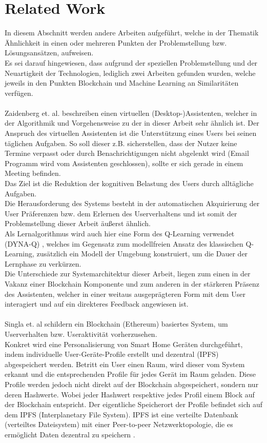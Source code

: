 \section{Related Work}
In diesem Abschnitt werden andere Arbeiten aufgeführt, welche in der Thematik Ähnlichkeit in einen oder mehreren Punkten der Problemstellung bzw. Lösungsansätzen, aufweisen. \\
Es sei darauf hingewiesen, dass aufgrund der speziellen Problemstellung und der Neuartigkeit der Technologien, lediglich zwei Arbeiten gefunden wurden, welche jeweils in den Punkten Blockchain und Machine Learning an Similaritäten verfügen. \\\\
Zaidenberg et. al. \cite{zaidenberg:hal-00788028} beschreiben einen virtuellen (Desktop-)Assistenten, welcher in der Al­go­rith­mik und Vorgehensweise zu der in dieser Arbeit sehr ähnlich ist. Der Anspruch des virtuellen Assistenten ist die Unterstützung eines Users bei seinen täglichen Aufgaben. So soll dieser z.B. sicherstellen, dass der Nutzer keine Termine verpasst oder durch Benachrichtigungen nicht abgelenkt wird (Email Programm wird vom Assistenten geschlossen), sollte er sich gerade in einem Meeting befinden. \\
Das Ziel ist die Reduktion der kognitiven Belastung des Users durch alltägliche Aufgaben. \\
Die Herausforderung des Systems besteht in der automatischen Ak­qui­rie­rung der User Präferenzen bzw. dem Erlernen des Userverhaltens und ist somit der Problemstellung dieser Arbeit äußerst ähnlich.\\
Als Lernalgorithmus wird auch hier eine Form des Q-Learning verwendet (DYNA-Q) \cite{Sutton}, welches im Gegensatz zum modellfreien Ansatz des klassischen Q-Learning, zusätzlich ein Modell der Umgebung konstruiert, um die Dauer der Lernphase zu verkürzen.\\
Die Unterschiede zur Systemarchitektur dieser Arbeit, liegen zum einen in der Vakanz einer Blockchain Komponente und zum anderen in der stärkeren Präsenz des Assistenten, welcher in einer weitaus ausgeprägteren Form mit dem User interagiert und auf ein direkteres Feedback angewiesen ist. \\\\
Singla et. al \cite{Singla:MLSDPUB} schildern ein Blockchain (Ethereum) basiertes System, um Userverhalten bzw. Useraktivität vorherzusehen.\\
Konkret wird eine Personalisierung von Smart Home Geräten durchgeführt, indem individuelle User-Geräte-Profile erstellt und dezentral (IPFS) abgespeichert werden. Betritt ein User einen Raum, wird dieser vom System erkannt und die entsprechenden Profile für jedes Gerät im Raum geladen. Diese Profile werden jedoch nicht direkt auf der Blockchain abgespeichert, sondern nur deren Hashwerte. Wobei jeder Hashwert respektive jedes Profil einem Block auf der Blockchain entspricht. Der eigentliche Speicherort der Profile befindet sich auf dem IPFS (Interplanetary File System). IPFS ist eine verteilte Datenbank (verteiltes Dateisystem) mit einer Peer-to-peer Netzwerktopologie, die es ermöglicht Daten dezentral zu speichern \cite{IPFSIO, IPFSWP}.\\

